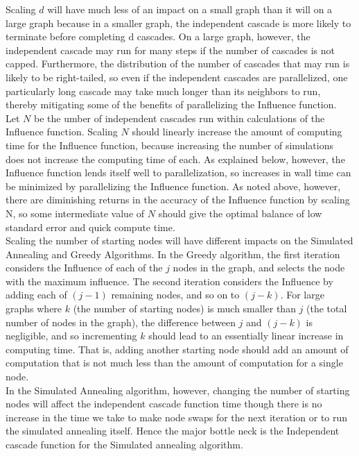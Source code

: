 \documentclass[11pt]{scrartcl} %
\begin{document}
Scaling $d$ will have much less of an impact on a small graph than it will on a large graph because in a smaller graph, the independent cascade is more likely to terminate before completing d cascades.  On a large graph, however, the independent cascade may run for many steps if the number of cascades is not capped.  Furthermore, the distribution of the number of cascades that may run is likely to be right-tailed, so even if the independent cascades are parallelized, one particularly long cascade may take much longer than its neighbors to run, thereby mitigating some of the benefits of parallelizing the Influence function.\\

Let $N$ be the umber of independent cascades run within calculations of the Influence function. Scaling $N$ should linearly increase the amount of computing time for the Influence function, because increasing the number of simulations does not increase the computing time of each.  As explained below, however, the Influence function lends itself well to parallelization, so increases in wall time can be minimized by parallelizing the Influence function.  As noted above, however, there are diminishing returns in the accuracy of the Influence function by scaling N, so some intermediate value of $N$ should give the optimal balance of low standard error and quick compute time.\\

Scaling the number of starting nodes will have different impacts on the Simulated Annealing and Greedy Algorithms. In the Greedy algorithm, the first iteration considers the Influence of each of the $j$ nodes in the graph, and selects the node with the maximum influence.  The second iteration considers the Influence by adding each of $(j-1)$ remaining nodes, and so on to $(j-k)$.  For large graphs where $k$ (the number of starting nodes) is much smaller than $j$ (the total number of nodes in the graph), the difference between $j$ and $(j-k)$ is negligible, and so incrementing $k$ should lead to an essentially linear increase in computing time.  That is, adding another starting node should add an amount of computation that is not much less than the amount of computation for a single node.\\

In the Simulated Annealing algorithm, however, changing the number of starting nodes will affect the independent cascade function time though there is no increase in the time we take to make node swaps for the next iteration or to run the simulated annealing itself. Hence the major bottle neck is the Independent cascade function for the Simulated annealing algorithm. 
\end{document}
